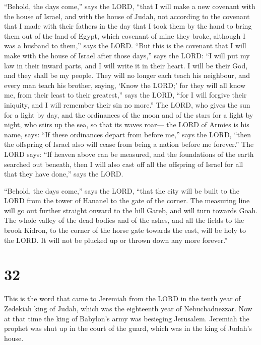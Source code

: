  ``Behold, the days come,'' says the LORD, ``that I will
make a new covenant with the house of Israel, and with the house of
Judah,  not according to the covenant that I made with
their fathers in the day that I took them by the hand to bring them out
of the land of Egypt, which covenant of mine they broke, although I was
a husband to them,'' says the LORD.  ``But this is the
covenant that I will make with the house of Israel after those days,''
says the LORD: ``I will put my law in their inward parts, and I will
write it in their heart. I will be their God, and they shall be my
people.  They will no longer each teach his neighbour,
and every man teach his brother, saying, `Know the LORD;' for they will
all know me, from their least to their greatest,'' says the LORD, ``for
I will forgive their iniquity, and I will remember their sin no more.''
 The LORD, who gives the sun for a light by day, and the
ordinances of the moon and of the stars for a light by night, who stirs
up the sea, so that its waves roar--- the LORD of Armies is his name,
says:  ``If these ordinances depart from before me,''
says the LORD, ``then the offspring of Israel also will cease from being
a nation before me forever.''  The LORD says: ``If heaven
above can be measured, and the foundations of the earth searched out
beneath, then I will also cast off all the offspring of Israel for all
that they have done,'' says the LORD.

 ``Behold, the days come,'' says the LORD, ``that the
city will be built to the LORD from the tower of Hananel to the gate of
the corner.  The measuring line will go out further
straight onward to the hill Gareb, and will turn towards Goah.
 The whole valley of the dead bodies and of the ashes,
and all the fields to the brook Kidron, to the corner of the horse gate
towards the east, will be holy to the LORD. It will not be plucked up or
thrown down any more forever.''

\hypertarget{section-31}{%
\section{32}\label{section-31}}

 This is the word that came to Jeremiah from the LORD in
the tenth year of Zedekiah king of Judah, which was the eighteenth year
of Nebuchadnezzar.  Now at that time the king of Babylon's
army was besieging Jerusalem. Jeremiah the prophet was shut up in the
court of the guard, which was in the king of Judah's house.

